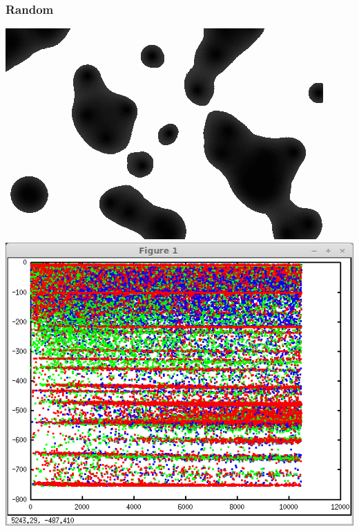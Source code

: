 \documentclass[../resume.tex]{subfiles}
\begin{document}
\subsubsection{Random}
\href{https://twitter.com/randompast/status/889302877113602048}{\includegraphics[scale=0.4]{../TAing/metaballs.png}}
\includegraphics[scale=0.27]{../scientific/50Topics_first3.png} 
\end{document}
